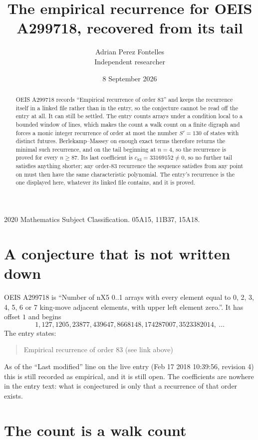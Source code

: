 \documentclass[11pt,a4paper]{article}
\title{The empirical recurrence for OEIS A299718, recovered from its tail}
\author{Adrian Perez Fontelles\\ \small Independent researcher}
\date{8 September 2026}
\theoremstyle{plain}
\theoremstyle{definition}
\begin{document}
\maketitle

\begin{abstract}
OEIS A299718 records ``Empirical recurrence of order $83$'' and keeps the recurrence itself in
a linked file rather than in the entry, so the conjecture cannot be read off the entry at all.
It can still be settled. The entry counts arrays under a condition local to a bounded window of
lines, which makes the count a walk count on a finite digraph and forces a monic integer
recurrence of order at most the number $S'=130$ of states with distinct futures. Berlekamp--Massey on
enough exact terms therefore returns the minimal such recurrence, and on the tail beginning at $n=4$, so the recurrence is proved for every $n\ge87$.
Its last coefficient is $c_{83}=33169152\neq0$, so no further tail satisfies anything
shorter; any order-$83$ recurrence the sequence satisfies from any point on must then have
the same characteristic polynomial. The entry's recurrence is the one displayed here, whatever
its linked file contains, and it is proved.
\end{abstract}

\noindent\small 2020 Mathematics Subject Classification. 05A15, 11B37, 15A18.\normalsize

\section{A conjecture that is not written down}

OEIS A299718 is ``Number of nX5 0..1 arrays with every element equal to 0, 2, 3, 4, 5, 6 or 7 king-move adjacent elements, with upper left element zero.''. It has offset $1$ and begins
\[
1, 127, 1205, 23877, 439647, 8668148, 174287007, 3523382014,\ \dots
\]
The entry states:
\begin{quote}
Empirical recurrence of order 83 (see link above)
\end{quote}
As of the ``Last modified'' line on the live entry (Feb 17 2018 10:39:56, revision 4)
this is still recorded as empirical, and it is still open. The coefficients are nowhere in the
entry text: what is conjectured is only that a recurrence of that order exists.

\section{The count is a walk count}
\end{document}
